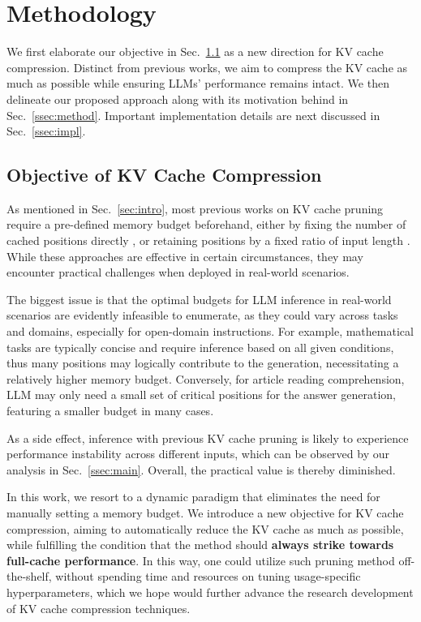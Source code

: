 \section{Methodology}
\label{method}

We first elaborate our objective in Sec.~\ref{ssec:obj} as a new direction for KV cache compression. Distinct from previous works, we aim to compress the KV cache as much as possible while ensuring LLMs' performance remains intact. 
We then delineate our proposed approach along with its motivation behind in Sec.~\ref{ssec:method}. Important implementation details are next discussed in Sec.~\ref{ssec:impl}.

\subsection{Objective of KV Cache Compression}
\label{ssec:obj}

As mentioned in Sec.~\ref{sec:intro}, most previous works on KV cache pruning require a pre-defined memory budget beforehand, either by fixing the number of cached positions directly \cite{DBLP:journals/corr/abs-2406-02069,DBLP:conf/nips/LiHYVLYCLC24}, or retaining positions by a fixed ratio of input length \cite{DBLP:conf/nips/Zhang00CZC0TRBW23,DBLP:journals/corr/abs-2406-13035}. While these approaches are effective in certain circumstances, they may encounter practical challenges when deployed in real-world scenarios.

The biggest issue is that the optimal budgets for LLM inference in real-world scenarios are evidently infeasible to enumerate, as they could vary across tasks and domains, especially for open-domain instructions. 
For example, mathematical tasks are typically concise and require inference based on all given conditions, thus many positions may logically contribute to the generation, necessitating a relatively higher memory budget. 
Conversely, for article reading comprehension, LLM may only need a small set of critical positions for the answer generation, featuring a smaller budget in many cases.

As a side effect, inference with previous KV cache pruning is likely to experience performance instability across different inputs, which can be observed by our analysis in Sec.~\ref{ssec:main}. Overall, the practical value is thereby diminished.

In this work, we resort to a dynamic paradigm that eliminates the need for manually setting a memory budget.
We introduce a new objective for KV cache compression, aiming to automatically reduce the KV cache as much as possible, while fulfilling the condition that the method should \textbf{always strike towards full-cache performance}.
In this way, one could utilize such pruning method off-the-shelf, without spending time and resources on tuning usage-specific hyperparameters, which we hope would further advance the research development of KV cache compression techniques.

